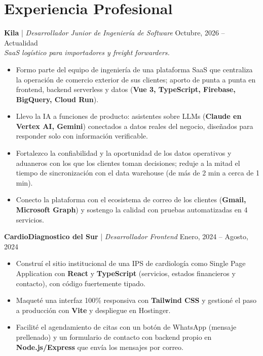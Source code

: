 \documentclass[11pt,a4paper]{article}
\begin{document}
\section*{Experiencia Profesional}

\noindent
\textbf{Kila} | \textit{Desarrollador Junior de Ingeniería de Software} \hfill Octubre, 2026 – Actualidad \\
\textit{SaaS logístico para importadores y freight forwarders.}
\begin{itemize}[leftmargin=*, noitemsep, topsep=2pt]
    \item Formo parte del equipo de ingeniería de una plataforma SaaS que centraliza la operación de comercio exterior de sus clientes; aporto de punta a punta en frontend, backend serverless y datos (\textbf{Vue 3, TypeScript, Firebase, BigQuery, Cloud Run}).
    \item Llevo la IA a funciones de producto: asistentes sobre LLMs (\textbf{Claude en Vertex AI, Gemini}) conectados a datos reales del negocio, diseñados para responder solo con información verificable.
    \item Fortalezco la confiabilidad y la oportunidad de los datos operativos y aduaneros con los que los clientes toman decisiones; reduje a la mitad el tiempo de sincronización con el data warehouse (de más de 2 min a cerca de 1 min).
    \item Conecto la plataforma con el ecosistema de correo de los clientes (\textbf{Gmail, Microsoft Graph}) y sostengo la calidad con pruebas automatizadas en 4 servicios.
\end{itemize}

\vspace{0.2cm}

\noindent
\textbf{CardioDiagnostico del Sur} | \textit{Desarrollador Frontend} \hfill Enero, 2024 – Agosto, 2024
\begin{itemize}[leftmargin=*, noitemsep, topsep=2pt]
    \item Construí el sitio institucional de una IPS de cardiología como Single Page Application con \textbf{React} y \textbf{TypeScript} (servicios, estados financieros y contacto), con código fuertemente tipado.
    \item Maqueté una interfaz 100\% responsiva con \textbf{Tailwind CSS} y gestioné el paso a producción con \textbf{Vite} y despliegue en Hostinger.
    \item Facilité el agendamiento de citas con un botón de WhatsApp (mensaje prellenado) y un formulario de contacto con backend propio en \textbf{Node.js/Express} que envía los mensajes por correo.
\end{itemize}
\end{document}

